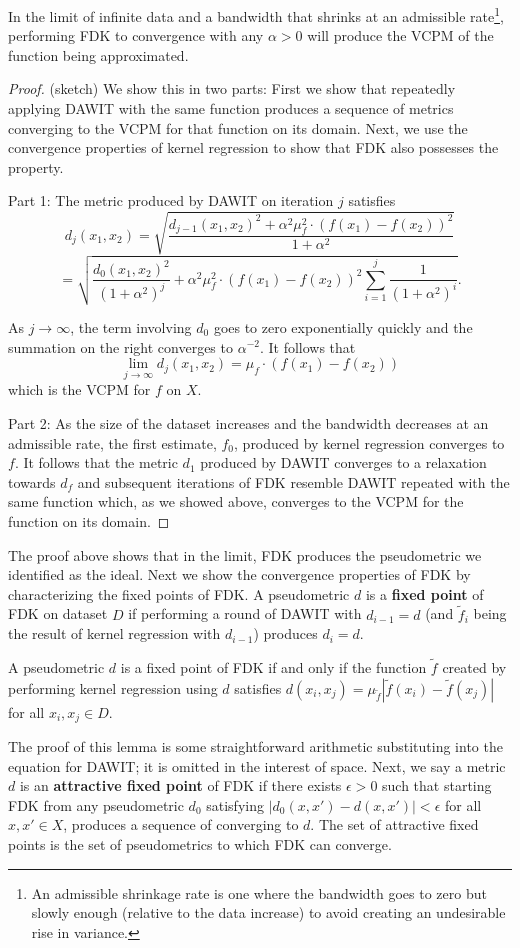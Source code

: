 \documentclass{article} %
\newenvironment{claim}[1][Claim]{\begin{trivlist}
\item[\hskip \labelsep {\bfseries #1}]}{\end{trivlist}}
\newenvironment{lemma}[1][Lemma]{\begin{trivlist}
\item[\hskip \labelsep {\bfseries #1}]}{\end{trivlist}}
\begin{document}
\begin{claim}
In the limit of infinite data and a bandwidth that shrinks at an
admissible rate\footnote{An admissible shrinkage rate \cite{kbrl}
is one where the bandwidth goes to zero but slowly enough (relative to the data increase)
to avoid creating an undesirable rise in variance.},
performing FDK to convergence with any $\alpha > 0$ will produce the VCPM of the function being approximated.
\end{claim}
\begin{proof} (sketch) We show this in two parts: First we show that repeatedly applying
DAWIT with the same function produces a sequence of metrics converging to the
VCPM for that function on its domain. Next, we use the
convergence properties of kernel regression to show that FDK also possesses the property.

Part 1: The metric produced by DAWIT on iteration $j$ satisfies
$$d_j(x_1, x_2) = 
\sqrt{\frac{d_{j-1}(x_1, x_2)^2 + \alpha^2\mu_{f}^2
\cdot(f(x_1) - f(x_2))^2}{1 + \alpha^2}}$$
$$= \sqrt{\frac{d_0(x_1, x_2)^2}{(1+\alpha^2)^j} + \alpha^2\mu_{f}^2
\cdot(f(x_1) - f(x_2))^2\sum_{i=1}^j\frac{1}{(1 + \alpha^2)^i}}.$$

As $j \to \infty$, the term involving $d_0$ goes to zero
exponentially quickly and the summation on the right converges to
$\alpha^{-2}$.
It follows that
$$\lim_{j\to \infty} d_j(x_1, x_2) = \mu_{f}\cdot(f(x_1) - f(x_2))$$
which is the VCPM for $f$ on $X$.

Part 2: As the size of the dataset increases and the bandwidth decreases at an admissible rate,
the first estimate, $f_0$, produced by kernel regression converges to $f$. It follows that
the metric $d_1$ produced by DAWIT converges to a relaxation towards $d_f$ and subsequent
iterations of FDK resemble DAWIT repeated with the same function which, as we showed above,
converges to the VCPM for the function on its domain.
\end{proof}
The proof above shows that in the limit, FDK produces the pseudometric we identified as the ideal.
Next we show the convergence properties of FDK by characterizing the fixed points of FDK.
A pseudometric $d$ is a \textbf{fixed point} of FDK on dataset $D$ if performing a round of DAWIT
with $d_{i-1}=d$ (and $\tilde f_i$ being the result of kernel regression with $d_{i-1}$)
produces $d_i=d$.
\begin{lemma}A pseudometric $d$ is a fixed point of FDK if and only if the function $\tilde f$ created by
performing kernel regression using $d$ satisfies
$d(x_i, x_j) = \mu_{\tilde f}|\tilde f(x_i) - \tilde f(x_j)|$ for all $x_i, x_j \in D$.
\end{lemma}
The proof of this lemma is some straightforward arithmetic substituting into the equation for DAWIT;
it is omitted in the interest of space.
Next, we say a metric $d$ is an 
\textbf{attractive fixed point} of FDK
if there exists $\epsilon > 0$ such that starting FDK from any pseudometric $d_0$ satisfying
$|d_0(x,x') - d(x,x')| < \epsilon$ for all $x, x' \in X$, produces a sequence of converging to $d$.
The set of attractive fixed points is the set of pseudometrics to which FDK can converge.
\end{document}
